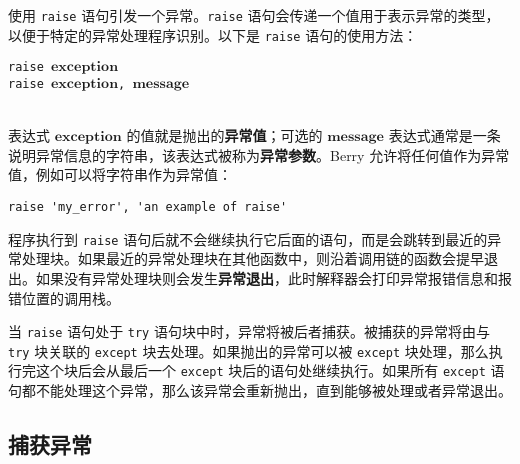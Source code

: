 使用 \texttt{raise} 语句引发一个异常。\texttt{raise} 语句会传递一个值用于表示异常的类型，以便于特定的异常处理程序识别。以下是 \texttt{raise} 语句的使用方法：
\begin{algorithm}
    \texttt{raise }$\bm{exception}$ \\
    \texttt{raise }$\bm{exception}$\texttt{, }$\bm{message}$
\end{algorithm}\vspace{-0.6em}\\
表达式 $\bm{exception}$ 的值就是抛出的\textbf{异常值}；可选的 $\bm{message}$ 表达式通常是一条说明异常信息的字符串，该表达式被称为\textbf{异常参数}。Berry 允许将任何值作为异常值，例如可以将字符串作为异常值：
\begin{lstlisting}[language=berry, numbers=none]
raise 'my_error', 'an example of raise'
\end{lstlisting}

程序执行到 \texttt{raise} 语句后就不会继续执行它后面的语句，而是会跳转到最近的异常处理块。如果最近的异常处理块在其他函数中，则沿着调用链的函数会提早退出。如果没有异常处理块则会发生\textbf{异常退出}，此时解释器会打印异常报错信息和报错位置的调用栈。

当 \texttt{raise} 语句处于 \texttt{try} 语句块中时，异常将被后者捕获。被捕获的异常将由与 \texttt{try} 块关联的 \texttt{except} 块去处理。如果抛出的异常可以被 \texttt{except} 块处理，那么执行完这个块后会从最后一个 \texttt{except} 块后的语句处继续执行。如果所有 \texttt{except} 语句都不能处理这个异常，那么该异常会重新抛出，直到能够被处理或者异常退出。


\subsection{捕获异常}

